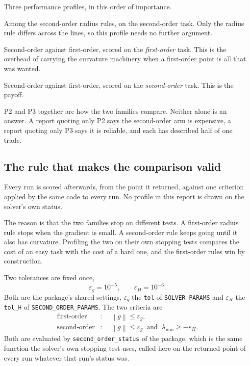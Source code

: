 \documentclass[11pt,a4paper]{article}
\providecommand{\norm}[1]{\left \lVert #1 \right \rVert}
\theoremstyle{remark}
\begin{document}
Three performance profiles, in this order of importance.

\begin{description}[leftmargin=2.2em, style=nextline]
  \item[P1] Among the second-order radius rules, on the second-order task. Only
    the radius rule differs across the lines, so this profile needs no further
    argument.
  \item[P2] Second-order against first-order, scored on the \emph{first-order}
    task. This is the overhead of carrying the curvature machinery when a
    first-order point is all that was wanted.
  \item[P3] Second-order against first-order, scored on the \emph{second-order}
    task. This is the payoff.
\end{description}

P2 and P3 together are how the two families compare. Neither alone is an answer.
A report quoting only P2 says the second-order arm is expensive, a report quoting
only P3 says it is reliable, and each has described half of one trade.

\subsection{The rule that makes the comparison valid}\label{sec: scoring}
  
Every run is scored afterwards, from the point it returned, against one criterion
applied by the same code to every run. No profile in this report is drawn on the
solver's own status.

The reason is that the two families stop on different tests. A first-order radius
rule stops when the gradient is small. A second-order rule keeps going until it
also has curvature. Profiling the two on their own stopping tests compares the
cost of an easy task with the cost of a hard one, and the first-order rules win by
construction.

Two tolerances are fixed once,
\begin{equation}
  \varepsilon_g = 10^{-5}, \qquad \varepsilon_H = 10^{-6} .
  \label{eqn: tolerances}
\end{equation}
Both are the package's shared settings, $\varepsilon_g$ the \texttt{tol} of
\texttt{SOLVER\_PARAMS} and $\varepsilon_H$ the \texttt{tol\_H} of
\texttt{SECOND\_ORDER\_PARAMS}. The two criteria are
\begin{align}
  \text{first-order} &: \quad \norm{g} \leq \varepsilon_g ,
  \label{eqn: first order criterion} \\
  \text{second-order} &: \quad \norm{g} \leq \varepsilon_g
     \ \text{ and } \ \lambda_{\min} \geq -\varepsilon_H .
  \label{eqn: second order criterion}
\end{align}
Both are evaluated by \texttt{second\_order\_status} of the package, which is the
same function the solver's own stopping test uses, called here on the returned
point of every run whatever that run's status was.
\end{document}
